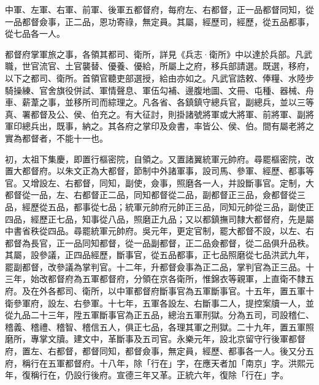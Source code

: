 中軍、左軍、右軍、前軍、後軍五都督府，每府左、右都督，正一品都督同知，從一品都督僉事，正二品，恩功寄祿，無定員。其屬，經歷司，經歷，從五品都事，從七品各一人。

都督府掌軍旅之事，各領其都司、衛所，詳見《兵志·衛所》中以達於兵部。凡武職，世官流官、土官襲替、優養、優給，所屬上之府，移兵部請選。既選，移府，以下之都司、衛所。首領官聽吏部選授，給由亦如之。凡武官誥敕、俸糧、水陸步騎操練、官舍旗役併試、軍情聲息、軍伍勾補、邊腹地圖、文冊、屯種、器械、舟車、薪葦之事，並移所司而綜理之。凡各省、各鎮鎮守總兵官，副總兵，並以三等真、署都督及公、侯、伯充之。有大征討，則掛諸號將軍或大將軍、前將軍、副將軍印總兵出，既事，納之。其各府之掌印及僉書，率皆公、侯、伯。間有屬老將之實為都督者，不能十一也。

初，太祖下集慶，即置行樞密院，自領之。又置諸翼統軍元帥府。尋罷樞密院，改置大都督府。以朱文正為大都督，節制中外諸軍事，設司馬、參軍、經歷、都事等官。又增設左、右都督，同知，副使，僉事，照磨各一人，并設斷事官。定制，大都督從一品，左、右都督正二品，同知都督從二品，副都督正三品，僉都督從三品，經歷從五品，都事從七品；統軍元帥府元帥正三品，同知元帥從三品，副使正四品，經歷正七品，知事從八品，照磨正九品；又以都鎮撫司隸大都督府，先是屬中書省秩從四品。尋罷統軍元帥府。吳元年，更定官制，罷大都督不設，以左、右都督為長官，正一品同知都督，從一品副都督，正二品僉都督，從二品俱升品秩。其屬，設參議，正四品經歷，斷事官，從五品都事，正七品照磨從七品洪武九年，罷副都督，改參議為掌判官。十二年，升都督僉事為正二品，掌判官為正三品。十三年，始改都督府為五軍都督府，分領在京各衛所，惟錦衣等親軍，上直衛不隸五府。及在外各都司、衛所，以中軍都督府斷事官為五軍斷事官。十五年，置五軍十衛參軍府，設左、右參軍。十七年，五軍各設左、右斷事二人，提控案牘一人，並從九品二十三年，陞五軍斷事官為正五品，總治五軍刑獄。分為五司，司設稽仁、稽義、稽禮、稽智、稽信五人，俱正七品，各理其軍之刑獄。二十九年，置五軍照磨所，專掌文牘。建文中，革斷事及五司官。永樂元年，設北京留守行後軍都督府，置左、右都督，都督同知，都督僉事，無定員，經歷、都事各一人。後又分五府，稱行在五軍都督府。十八年，除「行在」字，在應天者加「南京」字。洪熙元年，復稱行在，仍設行後府。宣德三年又革。正統六年，復除「行在」字。

